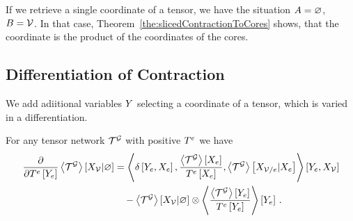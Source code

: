 If we retrieve a single coordinate of a tensor, we have the situation $A=\varnothing$, $B=\mathcal{V}$.
In that case, Theorem~\ref{the:slicedContractionToCores} shows, that the coordinate is the product of the coordinates of the cores. %



\subsection{Differentiation of Contraction}

We add adiitional variables $Y$ selecting a coordinate of a tensor, which is varied in a differentiation.

\begin{lemma}\label{lem:difMNprob}
	For any tensor network $\mathcal{T}^{\mathcal{G}}$ with positive $T^{e}$ we have
	\begin{align*}
		\frac{\partial }{\partial T^{e}\left[Y_{e}\right]} \left\langle \mathcal{T}^{\mathcal{G}}\right\rangle \left[ X_{\mathcal{V}} | \varnothing \right]
		& = \left\langle 
	 	\delta\left[Y_{e},X_{e}\right], 
		\frac{\left\langle \mathcal{T}^{\mathcal{G}}\right\rangle \left[ X_{e} \right]}{T^{e}\left[X_{e}\right]}, 
		\left\langle \mathcal{T}^{\mathcal{G}}\right\rangle \left[ X_{\mathcal{V}/e} | X_{e} \right] \right\rangle \left[ Y_{e},X_{\mathcal{V}} \right] \\
		& \quad -  \left\langle \mathcal{T}^{\mathcal{G}}\right\rangle \left[ X_{\mathcal{V}} | \varnothing \right] \otimes \left\langle \frac{\left\langle \mathcal{T}^{\mathcal{G}}\right\rangle \left[ Y_{e} \right]}{T^{e}\left[Y_{e}\right]}
		\right\rangle \left[ Y_{e} \right] \, .
	\end{align*}
\end{lemma}

